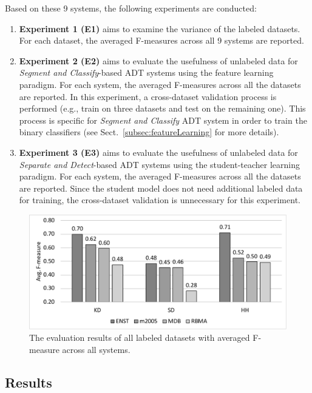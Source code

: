 \documentclass{article}
\begin{document}
Based on these 9 systems, the following experiments are conducted:
\begin{enumerate}[]
\item \textbf{Experiment 1 (E1)} aims to examine the variance of the labeled datasets. For each dataset, the averaged F-measures across all 9 systems are reported. 
\item \textbf{Experiment 2 (E2)} aims to evaluate the usefulness of unlabeled data for \textit{Segment and Classify}-based ADT systems using the feature learning paradigm. For each system, the averaged F-measures across all the datasets are reported. In this experiment, a cross-dataset validation process is performed (e.g., train on three datasets and test on the remaining one). This process is specific for \textit{Segment and Classify} ADT system in order to train the binary classifiers (see Sect.~\ref{subsec:featureLearning} for more details).
\item \textbf{Experiment 3 (E3)} aims to evaluate the usefulness of unlabeled data for \textit{Separate and Detect}-based ADT systems using the student-teacher learning paradigm. For each system, the averaged F-measures across all the datasets are reported. Since the student model does not need additional labeled data for training, the cross-dataset validation is unnecessary for this experiment. 
\end{enumerate}

\begin{figure}
\centering
\includegraphics[width = \columnwidth]{./figs/avgAcrossDatasets.pdf}
\caption{The evaluation results of all labeled datasets with averaged F-measure across all systems.}
\label{fig:resultsAcrossDatasets}
\end{figure}

\subsection{Results}
\end{document}
